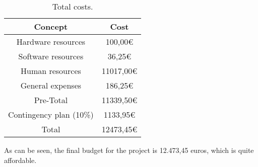 \begin{table}[!htb]
\centering
  \begin{tabular}{| c | c |}
  \hline Concept & Cost \\ \hline 
  Hardware resources & 100,00€  \\ \hline
  Software resources & 36,25€        \\ \hline 
  Human resources & 11017,00€        \\ \hline 
  General expenses & 186,25€        \\ \hline 
  Pre-Total & 11339,50€  \\ \hline 
  Contingency plan (10\%) & 1133,95€        \\ \hline \hline 
  Total & 12473,45€  \\ \hline 
  \end{tabular}
  \caption{Total costs.} \vspace{3pt}
  \label{tab:total}
\end{table}

As can be seen, the final budget for the project is 12.473,45 euros, which is quite affordable.
